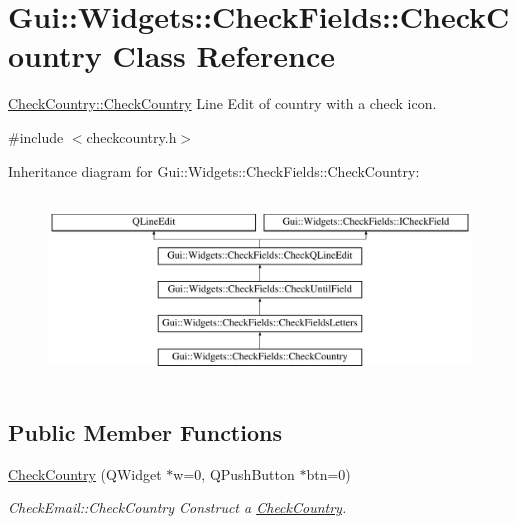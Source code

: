 \hypertarget{classGui_1_1Widgets_1_1CheckFields_1_1CheckCountry}{\section{Gui\-:\-:Widgets\-:\-:Check\-Fields\-:\-:Check\-Country Class Reference}
\label{classGui_1_1Widgets_1_1CheckFields_1_1CheckCountry}
}


\hyperlink{classGui_1_1Widgets_1_1CheckFields_1_1CheckCountry_ae432c47f8bede68b29a89af24b234eef}{Check\-Country\-::\-Check\-Country} Line Edit of country with a check icon.  




{\ttfamily \#include $<$checkcountry.\-h$>$}

Inheritance diagram for Gui\-:\-:Widgets\-:\-:Check\-Fields\-:\-:Check\-Country\-:\begin{figure}[H]
\begin{center}
\leavevmode
\includegraphics[height=5.000000cm]{d0/d3f/classGui_1_1Widgets_1_1CheckFields_1_1CheckCountry}
\end{center}
\end{figure}
\subsection*{Public Member Functions}
\begin{DoxyCompactItemize}
\item 
\hyperlink{classGui_1_1Widgets_1_1CheckFields_1_1CheckCountry_ae432c47f8bede68b29a89af24b234eef}{Check\-Country} (Q\-Widget $\ast$w=0, Q\-Push\-Button $\ast$btn=0)
\begin{DoxyCompactList}\small\item\em Check\-Email\-::\-Check\-Country Construct a \hyperlink{classGui_1_1Widgets_1_1CheckFields_1_1CheckCountry}{Check\-Country}. \end{DoxyCompactList}\end{DoxyCompactItemize}
